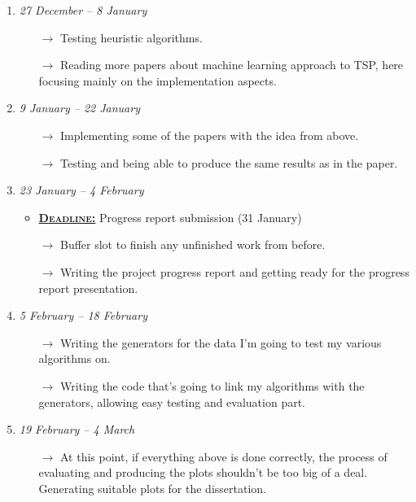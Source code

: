 \begin{enumerate}[label=\bf Part \arabic*:]
\begin{itemize}
        \end{itemize}
    \item \emph{27 December -- 8 January}
        \begin{itemize}
            \item[$\rightarrow$] Testing heuristic algorithms.
            \item[$\rightarrow$] Reading more papers about machine learning approach to TSP, here focusing mainly on the implementation aspects.
        \end{itemize}
    \item \emph{9 January -- 22 January}
        \begin{itemize}
            \item[$\rightarrow$] Implementing some of the papers with the idea from above.
            \item[$\rightarrow$] Testing and being able to produce the same results as in the paper.
        \end{itemize}
    \item \emph{23 January -- 4 February}
        \begin{itemize}
            \item \underline{\textbf{\textsc{Deadline:}}} Progress report submission (31 January)
            \item[$\rightarrow$] Buffer slot to finish any unfinished work from before.
            \item[$\rightarrow$] Writing the project progress report and getting ready for the progress report presentation.
        \end{itemize}
    \item \emph{5 February -- 18 February}
        \begin{itemize}
        	\item[$\rightarrow$] Writing the generators for the data I'm going to test my various algorithms on.
            \item[$\rightarrow$] Writing the code that's going to link my algorithms with the generators, allowing easy testing and evaluation part.
        \end{itemize}
    \item \emph{19 February -- 4 March}
        \begin{itemize}
            \item[$\rightarrow$] At this point, if everything above is done correctly, the process of evaluating and producing the plots shouldn't be too big of a deal. Generating suitable plots for the dissertation.

\end{itemize}
\end{enumerate}
